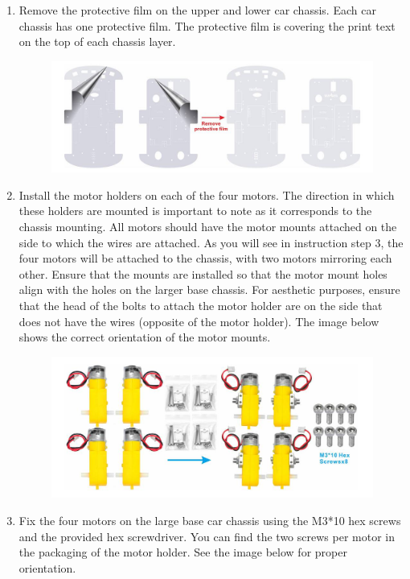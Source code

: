 \documentclass{article}
\begin{document}
	
	\begin{enumerate}
		\item Remove the protective film on the upper and lower car chassis. Each car chassis has one protective film. The protective film is covering the print text on the top of each 
		chassis layer. 
		
		\begin{figure}[H]
			\centering
			\includegraphics[width=0.7\linewidth]{image1}
			\label{fig:image1}
		\end{figure}
		
		
		\item Install the motor holders on each of the four motors. The direction in which these holders are mounted is important to note as it corresponds to the chassis mounting. All motors should have the motor mounts attached on the side to which the wires are attached. As you will see in instruction step 3, the four motors will be attached to the chassis, with two motors mirroring each other. Ensure that the mounts are installed so that the motor mount holes align with the holes on the larger base chassis. For aesthetic purposes, ensure that the head of the bolts to attach the motor holder are on the side that does not have the wires (opposite of the motor holder). The image below shows the correct orientation of the motor mounts.
		
		\begin{figure}[H]
			\centering
			\includegraphics[width=0.7\linewidth]{image2}
			\label{fig:image2}
		\end{figure}
		
		\item Fix the four motors on the large base car chassis using the M3*10 hex screws and the provided hex screwdriver. You can find the two screws per motor in the packaging of the motor holder. See the image below for proper orientation.
		

\end{enumerate}
\end{document}

